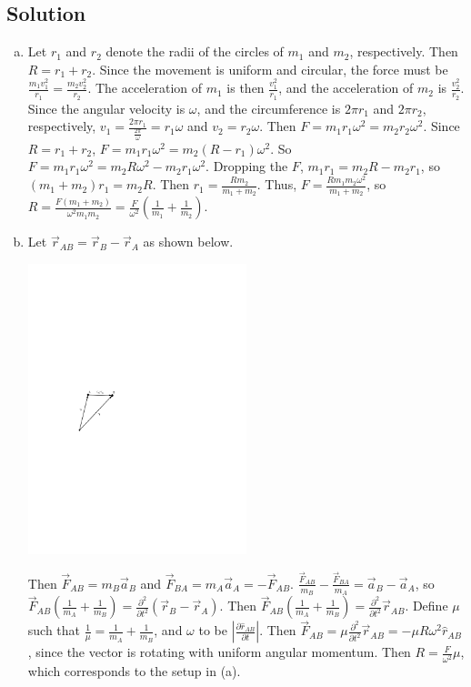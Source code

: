 \documentclass{esg8012pset}
\begin{document}
\begin{question}[Problem 2]
\subsection*{Solution}
\begin{enumerate}[a)]
  \item Let $r_1$ and $r_2$ denote the radii of the circles of $m_1$ and $m_2$, respectively.  Then $R = r_1 + r_2$.  Since the movement is uniform and circular, the force must be $\frac{m_1 v_1^2}{r_1} = \frac{m_2 v_2^2}{r_2}$.  The acceleration of $m_1$ is then $\frac{v_1^2}{r_1}$, and the acceleration of $m_2$ is $\frac{v_2^2}{r_2}$.  Since the angular velocity is $\omega$, and the circumference is $2\pi r_1$ and $2\pi r_2$, respectively, $v_1 = \frac{2\pi r_1}{\frac{2\pi}{\omega}} = r_1 \omega$ and $v_2 = r_2 \omega$.  Then $F = m_1 r_1 \omega^2 =  m_2 r_2 \omega^2$.  Since $R = r_1 + r_2$, $F = m_1 r_1 \omega^2 = m_2 (R - r_1) \omega^2$.  So $F = m_1 r_1 \omega^2 = m_2 R \omega^2 - m_2 r_1 \omega^2$.  Dropping the $F$, $m_1 r_1 = m_2 R - m_2 r_1$, so $(m_1 + m_2)r_1 = m_2 R$.  Then $r_1 = \frac{R m_2}{m_1 + m_2}$.  Thus, $F =  \frac{R m_1 m_2\omega^2}{m_1 + m_2}$, so $R = \frac{F(m_1+m_2)}{\omega^2 m_1 m_2} = \frac{F}{\omega^2}\left(\frac{1}{m_1}+\frac{1}{m_2}\right)$.
  \item Let $\vec r_{AB} = \vec r_B - \vec r_A$ as shown below. \begin{center}\includegraphics[width=0.5\textwidth]{2009-09-25_Diagram_10}\end{center}  Then $\vec F_{AB} = m_B \vec a_B$ and $\vec F_{BA} = m_A \vec a_A = -\vec F_{AB}$.  $\frac{\vec F_{AB}}{m_B} - \frac{\vec F_{BA}}{m_A} = \vec a_B - \vec a_A$, so $\vec F_{AB}\left(\frac{1}{m_A} + \frac{1}{m_B}\right) = \frac{\partial^2}{\partial t^2}(\vec r_B - \vec r_A)$.  Then $\vec F_{AB}\left(\frac{1}{m_A} + \frac{1}{m_B}\right) = \frac{\partial^2}{\partial t^2}\vec r_{AB}$.  Define $\mu$ such that $\frac{1}{\mu} = \frac{1}{m_A} + \frac{1}{m_B}$, and $\omega$ to be $\left\vert \frac{\partial \hat r_{AB}}{\partial t}\right\vert$.  Then $\vec F_{AB} = \mu \frac{\partial^2}{\partial t^2}\vec r_{AB} = -\mu R\omega^2\hat r_{AB}$, since the vector is rotating with uniform angular momentum.  Then $R = \frac{F}{\omega^2}\mu$, which corresponds to the setup in (a).
\end{enumerate}


\end{question}
\end{document}

